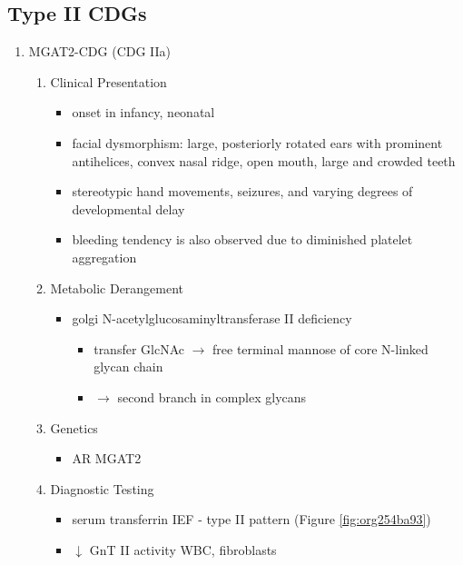 \documentclass{scrartcl}
\begin{document}
\subsection{Type II CDGs}
\label{sec:orge8e08d6}
\begin{enumerate}
\item MGAT2-CDG (CDG IIa)
\label{sec:org035dd2e}
\begin{enumerate}
\item Clinical Presentation
\label{sec:orgbafd396}
\begin{itemize}
\item onset in infancy, neonatal
\item facial dysmorphism: large, posteriorly rotated ears with prominent
antihelices, convex nasal ridge, open mouth, large and crowded
teeth
\item stereotypic hand movements, seizures, and varying degrees of
developmental delay
\item bleeding tendency is also observed due to diminished platelet
aggregation
\end{itemize}

\item Metabolic Derangement
\label{sec:org4b419a9}
\begin{itemize}
\item golgi N-acetylglucosaminyltransferase II deficiency
\begin{itemize}
\item transfer GlcNAc \(\to\) free terminal mannose of core N-linked glycan chain
\item \(\to\) second branch in complex glycans
\end{itemize}
\end{itemize}
\item Genetics
\label{sec:org97cc5ff}
\begin{itemize}
\item AR MGAT2
\end{itemize}
\item Diagnostic Testing
\label{sec:org3910379}
\begin{itemize}
\item serum transferrin IEF - type II pattern (Figure \ref{fig:org254ba93})
\item \(\downarrow\) GnT II activity WBC, fibroblasts
\end{itemize}


\end{enumerate}
\end{enumerate}
\end{document}
